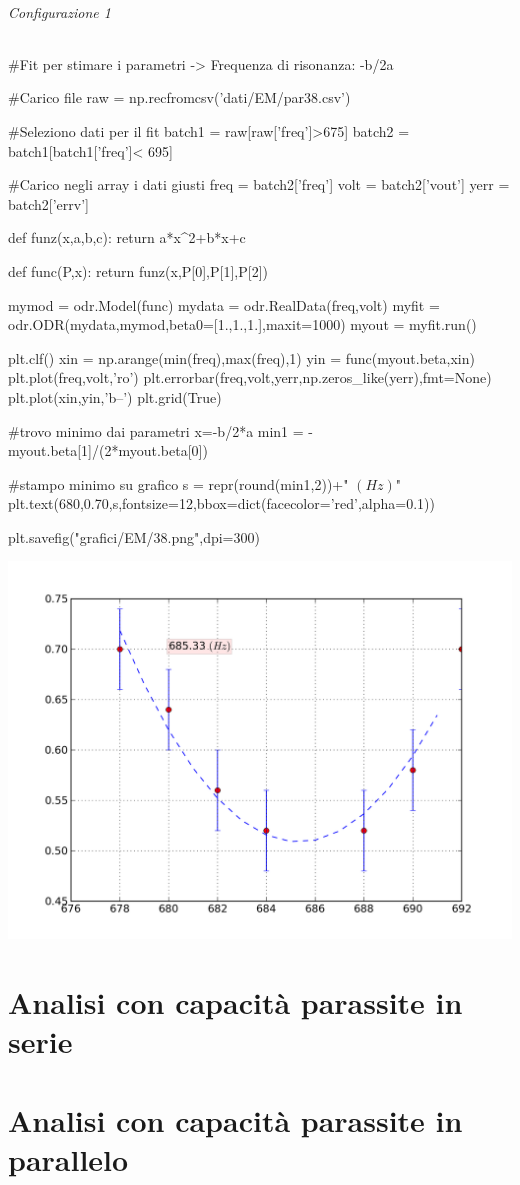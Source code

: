 \subparagraph*{Configurazione 1}
\begin{sagesilent}
#Fit per stimare i parametri -> Frequenza di risonanza: -b/2a

#Carico file
raw = np.recfromcsv('dati/EM/par38.csv')

#Seleziono dati per il fit
batch1 = raw[raw['freq']>675]
batch2 = batch1[batch1['freq']< 695]

#Carico negli array i dati giusti
freq = batch2['freq']
volt = batch2['vout']
yerr = batch2['errv']


def funz(x,a,b,c):
    return a*x^2+b*x+c

def func(P,x):
    return funz(x,P[0],P[1],P[2])

mymod = odr.Model(func)
mydata = odr.RealData(freq,volt)
myfit = odr.ODR(mydata,mymod,beta0=[1.,1.,1.],maxit=1000)
myout = myfit.run()

plt.clf()
xin = np.arange(min(freq),max(freq),1)
yin = func(myout.beta,xin)
plt.plot(freq,volt,'ro')
plt.errorbar(freq,volt,yerr,np.zeros_like(yerr),fmt=None)
plt.plot(xin,yin,'b--')
plt.grid(True)

#trovo minimo dai parametri x=-b/2*a
min1 = -myout.beta[1]/(2*myout.beta[0]) 

#stampo minimo su grafico
s = repr(round(min1,2))+" $(Hz)$"
plt.text(680,0.70,s,fontsize=12,bbox=dict(facecolor='red',alpha=0.1))

plt.savefig("grafici/EM/38.png",dpi=300)

\end{sagesilent}

\includegraphics[scale=0.75]{grafici/prova.png}

\chapter{Analisi con capacità parassite in serie}
\chapter{Analisi con capacità parassite in parallelo}


